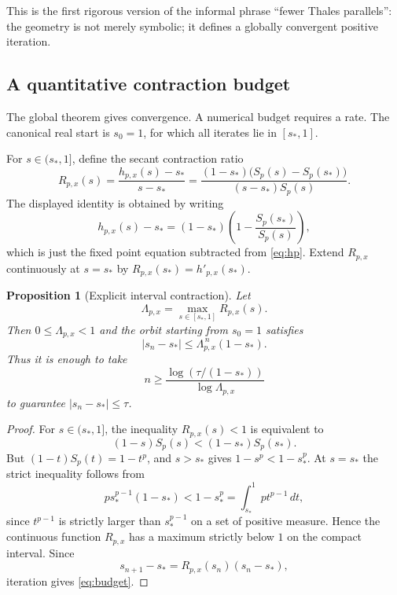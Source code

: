 \documentclass[11pt]{article}
\newtheorem{proposition}[theorem]{Proposition}
\theoremstyle{definition}
\theoremstyle{remark}
\begin{document}
This is the first rigorous version of the informal phrase ``fewer Thales parallels'': the geometry is not merely symbolic; it defines a globally convergent positive iteration.

\subsection{A quantitative contraction budget}

The global theorem gives convergence.  A numerical budget requires a rate.  The canonical real start is $s_0=1$, for which all iterates lie in $[s_*,1]$.

For $s\in(s_*,1]$, define the secant contraction ratio
\begin{equation}\label{eq:Rpx}
        R_{p,x}(s)
        =\frac{h_{p,x}(s)-s_*}{s-s_*}
        =\frac{(1-s_*)\bigl(S_p(s)-S_p(s_*)\bigr)}{(s-s_*)S_p(s)}.
\end{equation}
The displayed identity is obtained by writing
\[
        h_{p,x}(s)-s_*
        =(1-s_*)\left(1-\frac{S_p(s_*)}{S_p(s)}\right),
\]
which is just the fixed point equation subtracted from \eqref{eq:hp}.  Extend $R_{p,x}$ continuously at $s=s_*$ by $R_{p,x}(s_*)=h'_{p,x}(s_*)$.

\begin{proposition}[Explicit interval contraction]\label{prop:budget}
Let
\[
        \Lambda_{p,x}=\max_{s\in[s_*,1]} R_{p,x}(s).
\]
Then $0\leq \Lambda_{p,x}<1$ and the orbit starting from $s_0=1$ satisfies
\begin{equation}\label{eq:budget}
        |s_n-s_*|\leq \Lambda_{p,x}^{\,n}(1-s_*).
\end{equation}
Thus it is enough to take
\begin{equation}\label{eq:n-budget}
        n\geq
        \frac{\log(\tau/(1-s_*))}{\log \Lambda_{p,x}}
\end{equation}
to guarantee $|s_n-s_*|\leq \tau$.
\end{proposition}

\begin{proof}
For $s\in(s_*,1]$, the inequality $R_{p,x}(s)<1$ is equivalent to
\[
        (1-s)S_p(s)<(1-s_*)S_p(s_*).
\]
But $(1-t)S_p(t)=1-t^p$, and $s>s_*$ gives $1-s^p<1-s_*^p$.  At $s=s_*$ the strict inequality follows from
\[
        p s_*^{p-1}(1-s_*)<1-s_*^p
        =\int_{s_*}^{1}p t^{p-1}\,dt,
\]
since $t^{p-1}$ is strictly larger than $s_*^{p-1}$ on a set of positive measure.  Hence the continuous function $R_{p,x}$ has a maximum strictly below $1$ on the compact interval.  Since
\[
        s_{n+1}-s_* = R_{p,x}(s_n)(s_n-s_*),
\]
iteration gives \eqref{eq:budget}.
\end{proof}
\end{document}
